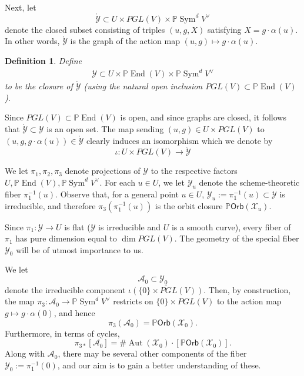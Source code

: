 \documentclass[12 pt, reqno]{amsart}
\newtheorem{defn}[thm]{Definition}
\theoremstyle{definition}
\newcommand{\on}{\operatorname}
\newcommand{\mb}{\mathbb}
\renewcommand{\P}{\mb{P}}
\newcommand{\Orb}{\mathsf{Orb}}
\begin{document}
Next, let
\[\mathring{\mathcal{Y}} \subset U \times PGL(V) \times \P
  \on{Sym}^{d}V^{\vee}\] denote the closed subset consisting of
triples $(u,g,X)$ satisfying $X = g \cdot \alpha(u)$.  In other words,
$\mathring{\mathcal{Y}}$ is the graph of the action map
$(u,g) \mapsto g \cdot \alpha(u)$.
\begin{defn}
  \label{def:Y}
  Define
\begin{align}
  \label{eq:Y}
  \mathcal{Y} \subset U \times \P \on{End}(V) \times \P \on{Sym}^{d}V^{\vee}
\end{align}
to be the closure of $\mathring{\mathcal{Y}}$ (using the natural open
inclusion $PGL(V) \subset \P \on{End}(V)$).
\end{defn}
Since $PGL(V) \subset \P \on{End}(V)$ is open, and since graphs are
closed, it follows that $\mathring{\mathcal{Y}} \subset \mathcal{Y}$
is an open set.  The map sending $(u,g) \in U \times PGL(V)$ to
$(u,g,g \cdot \alpha(u)) \in \mathring{\mathcal{Y}}$ clearly induces
an isomorphism which we denote by
\[\iota: U \times PGL(V) \to \mathring{\mathcal{Y}}\]


We let $\pi_{1}, \pi_{2}, \pi_{3}$ denote projections of $\mathcal{Y}$
to the respective factors
$U, \P \on{End}(V), \P \on{Sym}^{d}V^{\vee}$. For each $u \in U$, we
let $\mathcal{Y}_{u}$ denote the scheme-theoretic fiber
$\pi_{1}^{-1}(u)$. Observe that, for a general point $u \in U$,
$\mathcal{Y}_{u} := \pi_{1}^{-1}(u) \subset \mathcal{Y}$ is
irreducible, and therefore $\pi_{3}(\pi_{1}^{-1}(u))$ is the orbit
closure $\P\Orb(\mathcal{X}_{u})$.


Since $\pi_{1}: \mathcal{Y} \to U$ is flat ($\mathcal{Y}$ is
irreducible and $U$ is a smooth curve), every fiber of $\pi_{1}$ has
pure dimension equal to $\dim PGL(V)$.  The geometry of the special
fiber $\mathcal{Y}_{0}$ will be of utmost importance to us.

We let
\[\mathcal{A}_{0} \subset \mathcal{Y}_{0}\] denote the irreducible
component $\overline{\iota(\{0\} \times PGL(V))}$.  Then, by
construction, the map
$\pi_{3}: \mathcal{A}_{0} \to \P\on{Sym}^{d}V^{\vee}$ restricts on
$\{0\} \times PGL(V)$ to the action map $g \mapsto g \cdot \alpha(0)$,
and hence \[\pi_{3}(\mathcal{A}_{0}) = \P \Orb(\mathcal{X}_{0}).\]
Furthermore, in terms of cycles,
\[\pi_{3*}[\mathcal{A}_{0}] = \# \on{Aut}(\mathcal{X}_{0}) \cdot [\P \Orb(\mathcal{X}_{0})].\]
Along with $\mathcal{A}_{0}$, there may be several other components of
the fiber $\mathcal{Y}_{0} := \pi_{1}^{-1}(0)$, and our aim is to gain
a better understanding of these.
\end{document}

